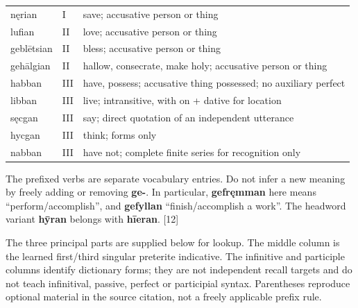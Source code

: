 \begin{longtable}{@{}>{\raggedright\arraybackslash}p{25mm}>{\raggedright\arraybackslash}p{11mm}>{\raggedright\arraybackslash}p{81mm}@{}}
nęrian & I & save; accusative person or thing \\
lufian & II & love; accusative person or thing \\
geblētsian & II & bless; accusative person or thing \\
gehālgian & II & hallow, consecrate, make holy; accusative person or thing \\
habban & III & have, possess; accusative thing possessed; no auxiliary perfect \\
libban & III & live; intransitive, with on + dative for location \\
sęcgan & III & say; direct quotation of an independent utterance \\
hycgan & III & think; forms only \\
nabban & III & have not; complete finite series for recognition only \\
\end{longtable}
\par\endgroup

The prefixed verbs are separate vocabulary entries. Do not infer a new meaning by freely adding or removing \textbf{ge-}. In particular, \textbf{gefręmman} here means “perform/\allowbreak{}accomplish”, and \textbf{gefyllan} “finish/\allowbreak{}accomplish a work”. The headword variant \textbf{hȳran} belongs with \textbf{hīeran}. [12]

The three principal parts are supplied below for lookup. The middle column is the learned first/\allowbreak{}third singular preterite indicative. The infinitive and participle columns identify dictionary forms; they are not independent recall targets and do not teach infinitival, passive, perfect or participial syntax. Parentheses reproduce optional material in the source citation, not a freely applicable prefix rule.

